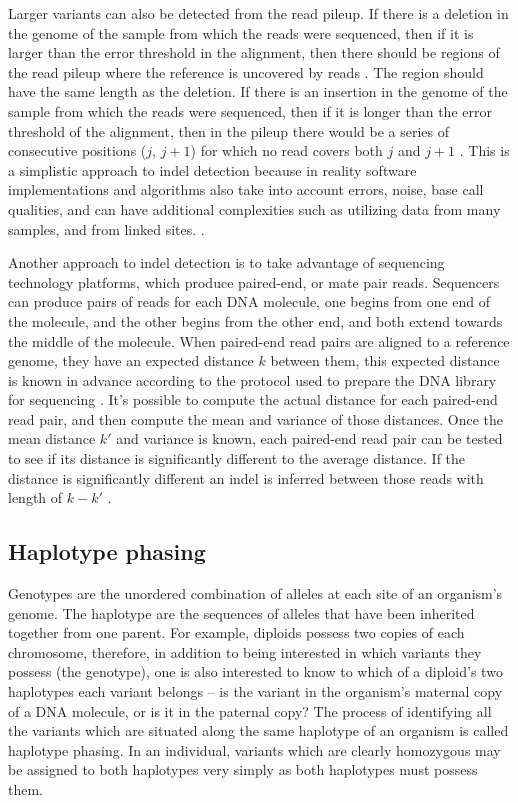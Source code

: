 Larger variants can also be detected from the read pileup.
If there is a deletion in the genome of the sample from which the reads were sequenced, then if it is larger than the error threshold in the alignment, then there should be regions of the read pileup where the reference is uncovered by reads \parencite{makinen2015genome}.
The region should have the same length as the deletion.
If there is an insertion in the genome of the sample from which the reads were sequenced, then if it is longer than the error threshold of the alignment, then in the pileup there would be a series of consecutive positions ($j$, $j+1$) for which no read covers both $j$ and $j+1$ \parencite{makinen2015genome}.
This is a simplistic approach to indel detection because in reality software implementations and algorithms also take into account errors, noise, base call qualities, and can have additional complexities such as utilizing data from many samples, and from linked sites. \parencite{Li2011,Nielsen2011,Mielczarek2016}.

Another approach to indel detection is to take advantage of sequencing technology platforms, which produce paired-end, or mate pair reads.
Sequencers can produce pairs of reads for each DNA molecule, one begins from one end of the molecule, and the other begins from the other end, and both extend towards the middle of the molecule.
When paired-end read pairs are aligned to a reference genome, they have an expected distance $k$ between them, this expected distance is known in advance according to the protocol used to prepare the DNA library for sequencing \parencite{makinen2015genome}.
It’s possible to compute the actual distance for each paired-end read pair, and then compute the mean and variance of those distances.
Once the mean distance $k'$ and variance is known, each paired-end read pair can be tested to see if its distance is significantly different to the average distance.
If the distance is significantly different an indel is inferred between those reads with length of $k-k'$ \parencite{makinen2015genome}. 


\subsection{Haplotype phasing}

Genotypes are the unordered combination of alleles at each site of an organism’s genome.
The haplotype are the sequences of alleles that have been inherited together from one parent.
For example, diploids possess two copies of each chromosome, therefore, in addition to being interested in which variants they possess (the genotype), one is also interested to know to which of a diploid’s two haplotypes each variant belongs – is the variant in the organism’s maternal copy of a DNA molecule, or is it in the paternal copy?
The process of identifying all the variants which are situated along the same haplotype of an organism is called haplotype phasing.
In an individual, variants which are clearly homozygous may be assigned to both haplotypes very simply as both haplotypes must possess them.

